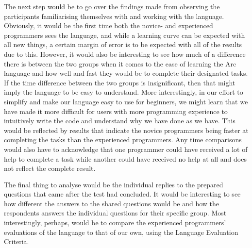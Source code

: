 The next step would be to go over the findings made from observing the participants familiarising themselves with and working with the language. Obviously, it would be the first time both the novice- and experienced programmers sees the language, and while a learning curve can be expected with all new things, a certain margin of error is to be expected with all of the results due to this. However, it would also be interesting to see how much of a difference there is between the two groups when it comes to the ease of learning the Arc language and how well and fast they would be to complete their designated tasks. If the time difference between the two groups is insignificant, then that might imply the language to be easy to understand. More interestingly, in our effort to simplify and make our language easy to use for beginners, we might learn that we have made it more difficult for users with more programming experience to intuitively write the code and understand why we have done as we have. This would be reflected by results that indicate the novice programmers being faster at completing the tasks than the experienced programmers. Any time comparisons would also have to acknowledge that one programmer could have received a lot of help to complete a task while another could have received no help at all and does not reflect the complete result.

The final thing to analyse would be the individual replies to the prepared questions that came after the test had concluded. It would be interesting to see how different the answers to the shared questions would be and how the respondents answers the individual questions for their specific group. Most interestingly, perhaps, would be to compare the experienced programmers' evaluations of the language to that of our own, using the Language Evaluation Criteria.